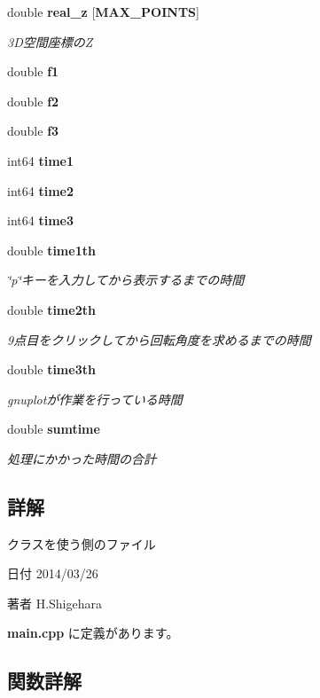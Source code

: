 \begin{DoxyCompactItemize}
double {\bf real\-\_\-z} [{\bf M\-A\-X\-\_\-\-P\-O\-I\-N\-T\-S}]
\begin{DoxyCompactList}\small\item\em 3\-D空間座標の\-Z \end{DoxyCompactList}\item 
double {\bf f1}
\item 
double {\bf f2}
\item 
double {\bf f3}
\item 
int64 {\bf time1}
\item 
int64 {\bf time2}
\item 
int64 {\bf time3}
\item 
double {\bf time1th}
\begin{DoxyCompactList}\small\item\em \char`\"{}p\char`\"{}キーを入力してから表示するまでの時間 \end{DoxyCompactList}\item 
double {\bf time2th}
\begin{DoxyCompactList}\small\item\em 9点目をクリックしてから回転角度を求めるまでの時間 \end{DoxyCompactList}\item 
double {\bf time3th}
\begin{DoxyCompactList}\small\item\em gnuplotが作業を行っている時間 \end{DoxyCompactList}\item 
double {\bf sumtime}
\begin{DoxyCompactList}\small\item\em 処理にかかった時間の合計 \end{DoxyCompactList}\end{DoxyCompactItemize}


\subsection{詳解}
クラスを使う側のファイル \begin{DoxyDate}{日付}
2014/03/26 
\end{DoxyDate}
\begin{DoxyAuthor}{著者}
H.\-Shigehara 
\end{DoxyAuthor}


 {\bf main.\-cpp} に定義があります。



\subsection{関数詳解}
